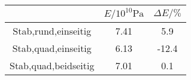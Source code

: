 
\label{tab:tabFehler}
	\begin{tabular}{cS[table-format=1.2]S[table-format=2.1]}
		\toprule
		{} & {$E/10^{10}\si{\pascal}$} & {$\Delta E/\%$}\\
		\midrule
		Stab,rund,einseitig  & 7.41 & 5.9\\
		Stab,quad,einseitig  & 6.13 & -12.4\\
		Stab,quad,beidseitig & 7.01 & 0.1\\
		\bottomrule
	\end{tabular}